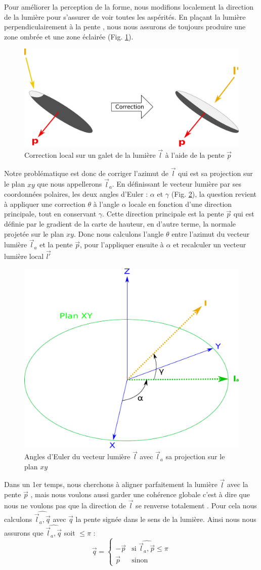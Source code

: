 Pour améliorer la perception de la forme, nous modifions localement la direction de la lumière pour s’assurer de voir toutes les aspérités. En plaçant la lumière perpendiculairement à la pente , nous nous assurons de toujours produire une zone ombrée et une zone éclairée (Fig. \ref{fig:correction}). 
\begin{figure}[!h]
\centering 
        \includegraphics[width=0.4\linewidth]{Solution/correction_light.pdf}
        \caption{\label{fig:correction} Correction local sur un galet de la lumière $\vec{l}$ à l'aide de la pente $\vec{p}$ }
\end{figure}
Notre problématique est donc de corriger l'azimut de $\vec{l}$ qui est sa projection sur le plan $xy$ que nous appellerons $\vec{l}_a$. En définissant le vecteur lumière par ses coordonnées polaires, les deux angles d'Euler : $\alpha$ et $\gamma$ (Fig. \ref{fig:euler}), la question revient à appliquer une correction $\theta$ à l'angle $\alpha$ locale en fonction d'une direction principale, tout en conservant $\gamma$. Cette direction principale est la pente $\vec{p}$ qui est définie par le gradient de la carte de hauteur, en d'autre terme, la normale projetée sur le plan $xy$. Donc nous calculons l'angle $\theta$ entre l'azimut du vecteur lumière $\vec{l}_a$ et la pente $\vec{p}$, pour l'appliquer ensuite à $\alpha$ et recalculer un vecteur lumière local $\vec{l'}$


\begin{figure}[!h]
\centering 
        \includegraphics[width=0.3\linewidth]{Solution/euler_V3.pdf}
        \caption{\label{fig:euler} Angles d'Euler du vecteur lumière $\vec{l}$ avec $\vec{l}_a$ sa projection sur le plan $xy$ }
\end{figure}

Dans un 1er temps, nous cherchons à aligner parfaitement la lumière $\vec{l}$ avec la pente $\vec{p}$ , mais nous voulons aussi garder une cohérence globale c'est à dire que nous ne voulons pas que la direction de $\vec{l}$ se renverse totalement . Pour cela nous calculons  $\widehat{\vec{l}_a,\vec{q}}$ avec $\vec{q}$ la pente signée dans le sens de la lumière. Ainsi nous nous assurons que $\widehat{\vec{l}_a,\vec{q}}$ soit $\leq \pi $ :
\begin{equation}
\label{equationReverseN}
\vec{q} = 
	\left\{
    \begin{array}{ll}
        -\vec{p} & \mbox{si } \widehat{\vec{l}_a,\vec{p}} \leq \pi\\
		\vec{p} & \mbox{sinon}				
    \end{array}
\right.
\end{equation}


